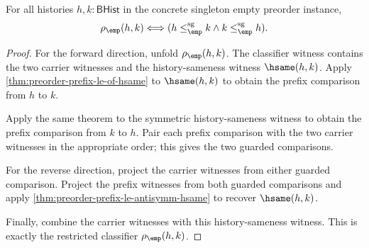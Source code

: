 \begin{theorem}
\label{thm:singleton-preorder-guarded-prefix-exactness}
For all histories $h,k:\mathsf{BHist}$ in the concrete singleton empty
preorder instance,
$$
\rho_{\emp}(h,k)
\Longleftrightarrow
(h\le_{\emp}^{\mathrm{sg}}k\land k\le_{\emp}^{\mathrm{sg}}h).
$$
\end{theorem}
\begin{proof}
For the forward direction, unfold $\rho_{\emp}(h,k)$. The classifier witness
contains the two carrier witnesses and the history-sameness witness
$\hsame(h,k)$. Apply \autoref{thm:preorder-prefix-le-of-hsame} to
$\hsame(h,k)$ to obtain the prefix comparison from $h$ to $k$.

Apply the same theorem to the symmetric history-sameness witness to obtain the
prefix comparison from $k$ to $h$. Pair each prefix comparison with the two
carrier witnesses in the appropriate order; this gives the two guarded
comparisons.

For the reverse direction, project the carrier witnesses from either guarded
comparison. Project the prefix witnesses from both guarded comparisons and
apply \autoref{thm:preorder-prefix-le-antisymm-hsame} to recover
$\hsame(h,k)$.

Finally, combine the carrier witnesses with this history-sameness witness.
This is exactly the restricted classifier $\rho_{\emp}(h,k)$.
\end{proof}

